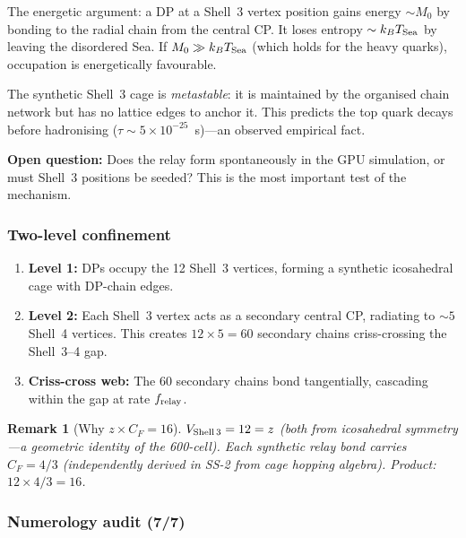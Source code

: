 \documentclass[11pt,letterpaper]{article}
\newtheorem{remark}[theorem]{Remark}
\begin{document}
The energetic argument: a DP at a Shell~3 vertex position gains
energy $\sim M_0$ by bonding to the radial chain from the central
CP.  It loses entropy $\sim k_B T_{\rm Sea}$ by leaving the
disordered Sea.  If $M_0 \gg k_B T_{\rm Sea}$ (which holds for
the heavy quarks), occupation is energetically favourable.

The synthetic Shell~3 cage is \emph{metastable}: it is maintained
by the organised chain network but has no lattice edges to anchor
it.  This predicts the top quark decays before hadronising
($\tau \sim 5 \times 10^{-25}$~s)---an observed empirical fact.

\textbf{Open question:} Does the relay form spontaneously in the
GPU simulation, or must Shell~3 positions be seeded?  This is the
most important test of the mechanism.

\subsubsection{Two-level confinement}

\begin{enumerate}
\item \textbf{Level 1:} DPs occupy the 12 Shell~3 vertices,
  forming a synthetic icosahedral cage with DP-chain edges.
\item \textbf{Level 2:} Each Shell~3 vertex acts as a secondary
  central CP, radiating to $\sim 5$ Shell~4 vertices.  This
  creates $12 \times 5 = 60$ secondary chains criss-crossing the
  Shell~3--4 gap.
\item \textbf{Criss-cross web:} The 60 secondary chains bond
  tangentially, cascading within the gap at rate $f_{\rm relay}$.
\end{enumerate}

\begin{remark}[Why $z \times C_F = 16$]
$V_{\rm Shell\,3} = 12 = z$ (both from icosahedral symmetry---a
geometric identity of the 600-cell).  Each synthetic relay bond
carries $C_F = 4/3$ (independently derived in SS-2 from cage
hopping algebra).  Product: $12 \times 4/3 = 16$.
\end{remark}

\subsubsection{Numerology audit (7/7)}
\end{document}
